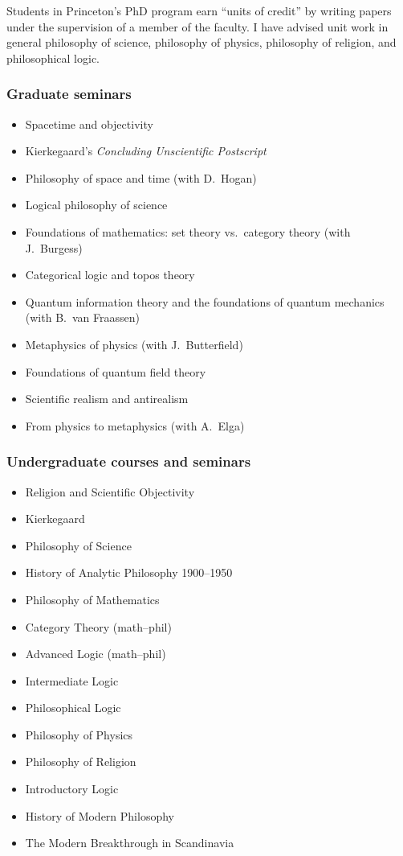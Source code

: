 \documentclass[11pt]{article}
\newcommand{\rubric}[1]{\subsubsection*{#1}}
\begin{document}
Students in Princeton's PhD program earn ``units of credit'' by writing papers
under the supervision of a member of the faculty. I have advised unit work in
general philosophy of science, philosophy of physics, philosophy of religion,
and philosophical logic.

\rubric{Graduate seminars}

\begin{itemize}
\item Spacetime and objectivity
\item Kierkegaard's \textit{Concluding Unscientific Postscript}
\item Philosophy of space and time (with D.\ Hogan)
\item Logical philosophy of science
\item Foundations of mathematics: set theory vs.\ category theory (with J.\ Burgess)
\item Categorical logic and topos theory
\item Quantum information theory and the foundations of quantum mechanics
  (with B.\ van Fraassen)
\item Metaphysics of physics (with J.\ Butterfield)
\item Foundations of quantum field theory
\item Scientific realism and antirealism
\item From physics to metaphysics (with A.\ Elga)
\end{itemize}

\rubric{Undergraduate courses and seminars}

\begin{itemize}
\item Religion and Scientific Objectivity
\item Kierkegaard
\item Philosophy of Science
\item History of Analytic Philosophy 1900--1950
\item Philosophy of Mathematics
\item Category Theory (math--phil)
\item Advanced Logic (math--phil)
\item Intermediate Logic
\item Philosophical Logic
\item Philosophy of Physics
\item Philosophy of Religion
\item Introductory Logic
\item History of Modern Philosophy
\item The Modern Breakthrough in Scandinavia
\end{itemize}
\end{document}
